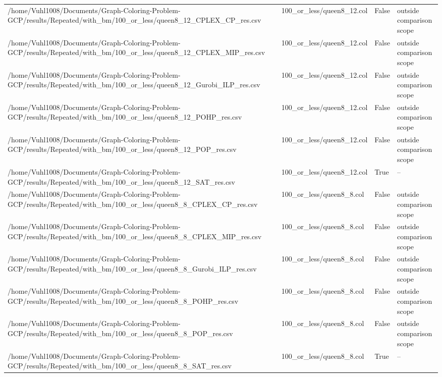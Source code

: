 \begin{table}[htbp]
\begin{tabular}{llll}
/home/Vuhl1008/Documents/Graph-Coloring-Problem-GCP/results/Repeated/with\_bm/100\_or\_less/queen8\_12\_CPLEX\_CP\_res.csv & 100\_or\_less/queen8\_12.col & False & outside comparison scope \\
/home/Vuhl1008/Documents/Graph-Coloring-Problem-GCP/results/Repeated/with\_bm/100\_or\_less/queen8\_12\_CPLEX\_MIP\_res.csv & 100\_or\_less/queen8\_12.col & False & outside comparison scope \\
/home/Vuhl1008/Documents/Graph-Coloring-Problem-GCP/results/Repeated/with\_bm/100\_or\_less/queen8\_12\_Gurobi\_ILP\_res.csv & 100\_or\_less/queen8\_12.col & False & outside comparison scope \\
/home/Vuhl1008/Documents/Graph-Coloring-Problem-GCP/results/Repeated/with\_bm/100\_or\_less/queen8\_12\_POHP\_res.csv & 100\_or\_less/queen8\_12.col & False & outside comparison scope \\
/home/Vuhl1008/Documents/Graph-Coloring-Problem-GCP/results/Repeated/with\_bm/100\_or\_less/queen8\_12\_POP\_res.csv & 100\_or\_less/queen8\_12.col & False & outside comparison scope \\
/home/Vuhl1008/Documents/Graph-Coloring-Problem-GCP/results/Repeated/with\_bm/100\_or\_less/queen8\_12\_SAT\_res.csv & 100\_or\_less/queen8\_12.col & True & -- \\
/home/Vuhl1008/Documents/Graph-Coloring-Problem-GCP/results/Repeated/with\_bm/100\_or\_less/queen8\_8\_CPLEX\_CP\_res.csv & 100\_or\_less/queen8\_8.col & False & outside comparison scope \\
/home/Vuhl1008/Documents/Graph-Coloring-Problem-GCP/results/Repeated/with\_bm/100\_or\_less/queen8\_8\_CPLEX\_MIP\_res.csv & 100\_or\_less/queen8\_8.col & False & outside comparison scope \\
/home/Vuhl1008/Documents/Graph-Coloring-Problem-GCP/results/Repeated/with\_bm/100\_or\_less/queen8\_8\_Gurobi\_ILP\_res.csv & 100\_or\_less/queen8\_8.col & False & outside comparison scope \\
/home/Vuhl1008/Documents/Graph-Coloring-Problem-GCP/results/Repeated/with\_bm/100\_or\_less/queen8\_8\_POHP\_res.csv & 100\_or\_less/queen8\_8.col & False & outside comparison scope \\
/home/Vuhl1008/Documents/Graph-Coloring-Problem-GCP/results/Repeated/with\_bm/100\_or\_less/queen8\_8\_POP\_res.csv & 100\_or\_less/queen8\_8.col & False & outside comparison scope \\
/home/Vuhl1008/Documents/Graph-Coloring-Problem-GCP/results/Repeated/with\_bm/100\_or\_less/queen8\_8\_SAT\_res.csv & 100\_or\_less/queen8\_8.col & True & -- \\

\end{tabular}
\end{table}
